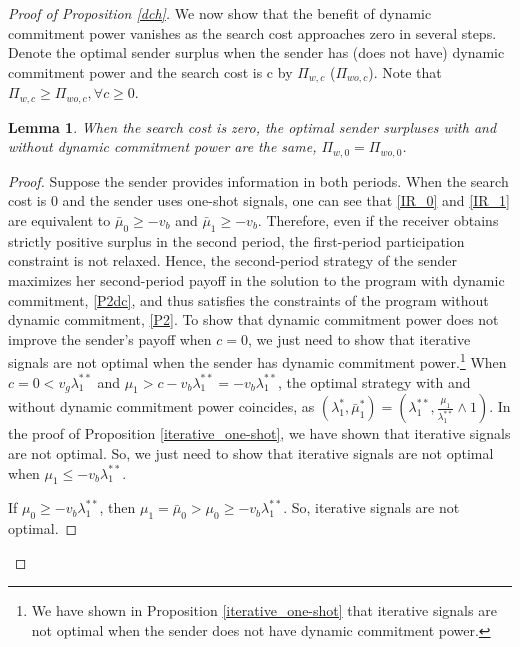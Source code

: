 \documentclass[11pt]{extarticle}
\newtheorem{lemma}{Lemma}
\newcommand{\m}{\wedge}
\begin{document}
\begin{proof}[Proof of Proposition \ref{dch}]
	We now show that the benefit of dynamic commitment power vanishes as the search cost approaches zero in several steps. Denote the optimal sender surplus when the sender has (does not have) dynamic commitment power and the search cost is c by $\Pi_{w,c}$ ($\Pi_{wo,c}$). Note that $\Pi_{w,c} \geq \Pi_{wo,c},\forall c \geq 0$.
	
	\begin{lemma}
		When the search cost is zero, the optimal sender surpluses with and without dynamic commitment power are the same, $\Pi_{w,0} = \Pi_{wo,0}$.
	\end{lemma}
	\begin{proof}
		Suppose the sender provides information in both periods. When the search cost is 0 and the sender uses one-shot signals, one can see that \eqref{IR_0} and \eqref{IR_1} are equivalent to $\bar{\mu}_0 \geq - v_b$ and $\bar{\mu}_1 \geq - v_b$. Therefore, even if the receiver obtains strictly positive surplus in the second period, the first-period participation constraint is not relaxed. Hence, the second-period strategy of the sender maximizes her second-period payoff in the solution to the program with dynamic commitment, \eqref{P2dc}, and thus satisfies the constraints of the program without dynamic commitment, \eqref{P2}. To show that dynamic commitment power does not improve the sender's payoff when $c = 0$, we just need to show that iterative signals are not optimal when the sender has dynamic commitment power.\footnote{We have shown in Proposition \ref{iterative_one-shot} that iterative signals are not optimal when the sender does not have dynamic commitment power.} When $c = 0 < v_g \lambda_1^{**}$ and $\mu_1 > c - v_b \lambda_1^{**} = - v_b \lambda_1^{**}$, the optimal strategy with and without dynamic commitment power coincides, as $(\lambda^*_1,\bar{\mu}_1^*) =  (\lambda_1^{**},\frac{\mu_1}{\lambda_1^{**}}\m 1)$. In the proof of Proposition \ref{iterative_one-shot}, we have shown that iterative signals are not optimal. So, we just need to show that iterative signals are not optimal when $\mu_1 \leq - v_b \lambda_1^{**}$.
		
		If $\mu_0 \geq - v_b \lambda_1^{**}$, then $\mu_1 = \bar{\mu}_0 > \mu_0 \geq - v_b \lambda_1^{**}$. So, iterative signals are not optimal.
		

\end{proof}
\end{proof}
\end{document}
